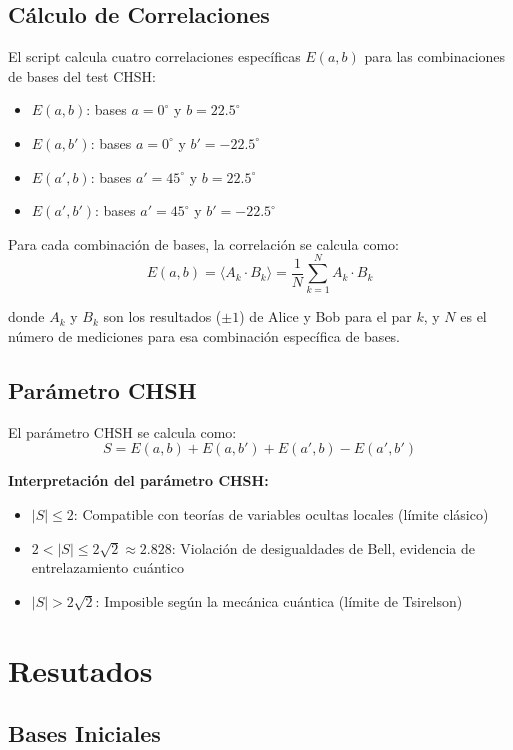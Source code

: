 \documentclass[11pt]{article}
\begin{document}
\subsection{Cálculo de Correlaciones}

El script calcula cuatro correlaciones específicas $E(a,b)$ para las combinaciones de bases del test CHSH:

\begin{itemize}
    \item $E(a,b)$: bases $a = 0^\circ$ y $b = 22.5^\circ$
    \item $E(a,b')$: bases $a = 0^\circ$ y $b' = -22.5^\circ$
    \item $E(a',b)$: bases $a' = 45^\circ$ y $b = 22.5^\circ$
    \item $E(a',b')$: bases $a' = 45^\circ$ y $b' = -22.5^\circ$
\end{itemize}

Para cada combinación de bases, la correlación se calcula como:
$$E(a,b) = \langle A_k \cdot B_k \rangle = \frac{1}{N} \sum_{k=1}^{N} A_k \cdot B_k$$

donde $A_k$ y $B_k$ son los resultados ($\pm 1$) de Alice y Bob para el par $k$, y $N$ es el número de mediciones para esa combinación específica de bases.

\subsection{Parámetro CHSH}

El parámetro CHSH se calcula como:
$$S = E(a,b) + E(a,b') + E(a',b) - E(a',b')$$

\textbf{Interpretación del parámetro CHSH:}
\begin{itemize}
    \item $|S| \leq 2$: Compatible con teorías de variables ocultas locales (límite clásico)
    \item $2 < |S| \leq 2\sqrt{2} \approx 2.828$: Violación de desigualdades de Bell, evidencia de entrelazamiento cuántico
    \item $|S| > 2\sqrt{2}$: Imposible según la mecánica cuántica (límite de Tsirelson)
\end{itemize}

\section{Resutados}

\subsection{Bases Iniciales}
\end{document}
